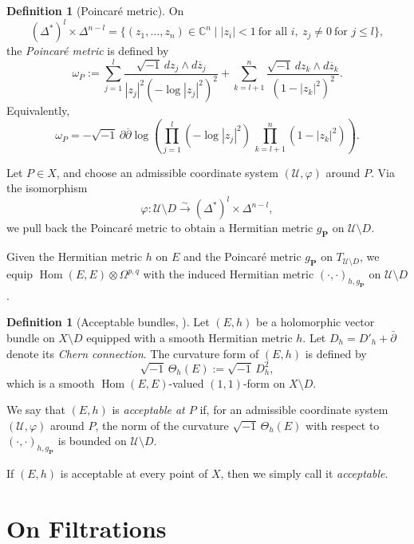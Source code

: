 \documentclass[12pt,twoside]{amsart}
\DeclareMathOperator{\Hom}{Hom}
\theoremstyle{definition}
\newtheorem{defn}[thm]{Definition}
\begin{document}
\begin{defn}[Poincar\'e metric]\label{x-def2.3}
On
\[
(\Delta^*)^l \times \Delta^{n-l}
= \{ (z_1,\dots,z_n)\in\mathbb{C}^n \mid |z_i|<1\ \text{for all }i,\ z_j\neq 0\ \text{for }j\le l\},
\]
the \emph{Poincar\'e metric} is defined by
\[
  \omega_P := \sum_{j=1}^l 
  \frac{\sqrt{-1}\,dz_j\wedge d\overline{z}_j}{|z_j|^2(-\log|z_j|^2)^2}
  +\sum_{k=l+1}^n \frac{\sqrt{-1}\,dz_k\wedge d\overline{z}_k}{(1-|z_k|^2)^2}.
\]
Equivalently,
\[
\omega_P = -\sqrt{-1}\,\partial\overline{\partial}
 \log\!\left(
    \prod_{j=1}^l (-\log|z_j|^2)\,
    \prod_{k=l+1}^n (1-|z_k|^2)
 \right).
\]
\end{defn}

Let $P\in X$, and choose an admissible coordinate system $(\mathcal{U},\varphi)$ around $P$.  
Via the isomorphism
\[
\varphi \colon \mathcal{U}\setminus D \xrightarrow{\sim} (\Delta^*)^l \times \Delta^{n-l},
\]
we pull back the Poincar\'e metric to obtain a Hermitian metric $g_{\mathbf{P}}$ on $\mathcal{U}\setminus D$.

Given the Hermitian metric $h$ on $E$ and the Poincaré metric $g_{\mathbf{P}}$ on $T_{\mathcal{U}\setminus D}$,  
we equip $\Hom(E, E)\otimes \Omega^{p,q}$ with the induced Hermitian metric 
$(\cdot,\cdot)_{h,g_{\mathbf{P}}}$ on $\mathcal{U}\setminus D$.

\begin{defn}[Acceptable bundles, {\cite[Definition~4.3]{mochizuki1}}]\label{x-def2.4}
Let $(E,h)$ be a holomorphic vector bundle on $X \setminus D$ equipped with a 
smooth Hermitian metric $h$.  
Let $D_h = D'_h + \bar\partial$ denote its \emph{Chern connection}. 
The curvature form of $(E,h)$ is defined by
\[
  \sqrt{-1}\,\Theta_h(E) := \sqrt{-1}\,D_h^2,
\]
which is a smooth $\Hom(E,E)$-valued $(1,1)$-form on $X \setminus D$.

We say that $(E,h)$ is \emph{acceptable at $P$} if, for an admissible coordinate system 
$(\mathcal{U},\varphi)$ around $P$, the norm of the curvature 
$\sqrt{-1}\,\Theta_h(E)$ with respect to $(\cdot,\cdot)_{h,g_{\mathbf{P}}}$ is bounded on 
$\mathcal{U} \setminus D$.

If $(E,h)$ is acceptable at every point of $X$, then we simply call it \emph{acceptable}.
\end{defn}

\section{On Filtrations}\label{x-sec3}
\end{document}
